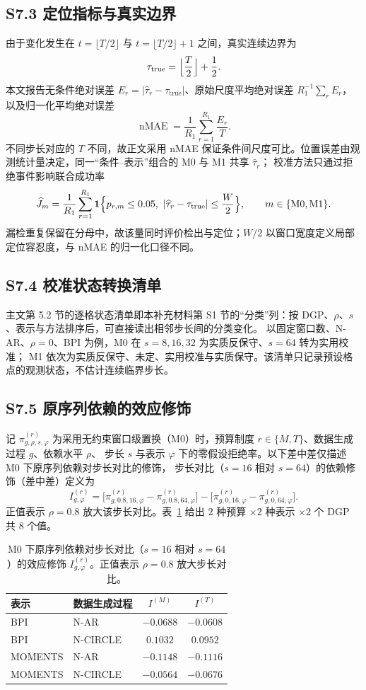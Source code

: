 \documentclass[UTF8,zihao=-4]{ctexart}
\theoremstyle{remark}
\begin{document}
\subsection*{S7.3 定位指标与真实边界}
由于变化发生在 $t=\lfloor T/2\rfloor$ 与 $t=\lfloor T/2\rfloor+1$ 之间，真实连续边界为
\[
 \tau_{\mathrm{true}}=\Bigl\lfloor\frac T2\Bigr\rfloor+\frac12 .
\]
本文报告无条件绝对误差 $E_r=|\widehat\tau_r-\tau_{\mathrm{true}}|$、原始尺度平均绝对误差 $R_1^{-1}\sum_rE_r$，以及归一化平均绝对误差
\[
 \operatorname{nMAE}=\frac1{R_1}\sum_{r=1}^{R_1}\frac{E_r}{T}.
\]
不同步长对应的 $T$ 不同，故正文采用 nMAE 保证条件间尺度可比。位置误差由观测统计量决定，同一“条件--表示”组合的 M0 与 M1 共享 $\widehat\tau_r$；
校准方法只通过拒绝事件影响联合成功率
\[
 \widehat J_m=\frac1{R_1}\sum_{r=1}^{R_1}\mathbf 1\Bigl\{p_{r,m}\le0.05,\ |\widehat\tau_r-\tau_{\mathrm{true}}|\le\frac W2\Bigr\},
 \qquad m\in\{\mathrm{M0},\mathrm{M1}\}.
\]
漏检重复保留在分母中，故该量同时评价检出与定位；$W/2$ 以窗口宽度定义局部定位容忍度，与 nMAE 的归一化口径不同。

\subsection*{S7.4 校准状态转换清单}
主文第 5.2 节的逐格状态清单即本补充材料第 S1 节的“分类”列：按 DGP、$\rho$、$s$、表示与方法排序后，可直接读出相邻步长间的分类变化。
以固定窗口数、N-AR、$\rho=0$、BPI 为例，M0 在 $s=8,16,32$ 为实质反保守、$s=64$ 转为实用校准；
M1 依次为实质反保守、未定、实用校准与实质保守。该清单只记录预设格点的观测状态，不估计连续临界步长。

\subsection*{S7.5 原序列依赖的效应修饰}
记 $\pi^{(r)}_{g,\rho,s,\varphi}$ 为采用无约束窗口级置换（M0）时，预算制度 $r\in\{M,T\}$、数据生成过程 $g$、依赖水平 $\rho$、
步长 $s$ 与表示 $\varphi$ 下的零假设拒绝率。以下差中差仅描述 M0 下原序列依赖对步长对比的修饰，
步长对比（$s=16$ 相对 $s=64$）的依赖修饰（差中差）定义为
\[
 I^{(r)}_{g,\varphi}
 =\bigl[\pi^{(r)}_{g,0.8,16,\varphi}-\pi^{(r)}_{g,0.8,64,\varphi}\bigr]
 -\bigl[\pi^{(r)}_{g,0,16,\varphi}-\pi^{(r)}_{g,0,64,\varphi}\bigr].
\]
正值表示 $\rho=0.8$ 放大该步长对比。表~\ref{tab:s7-rho} 给出 $2$ 种预算 $\times2$ 种表示
$\times2$ 个 DGP 共 $8$ 个值。

\begin{table}[ht]
\centering
\small
\caption{M0 下原序列依赖对步长对比（$s=16$ 相对 $s=64$）的效应修饰 $I^{(r)}_{g,\varphi}$。正值表示 $\rho=0.8$ 放大步长对比。}\label{tab:s7-rho}
\begin{tabular}{llcc}
\toprule
表示 & 数据生成过程 & $I^{(M)}$ & $I^{(T)}$\\
\midrule
BPI & N-AR & $-0.0688$ & $-0.0608$\\
BPI & N-CIRCLE & $0.1032$ & $0.0952$\\
MOMENTS & N-AR & $-0.1148$ & $-0.1116$\\
MOMENTS & N-CIRCLE & $-0.0564$ & $-0.0676$\\
\bottomrule
\end{tabular}
\end{table}
\end{document}
